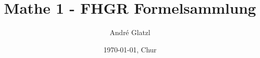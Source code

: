 \documentclass[11pt]{article}
\title{Mathe 1 - FHGR Formelsammlung}
\author{André Glatzl}
\date{\today{}, Chur}
\begin{document}
\scriptsize










\end{document}
